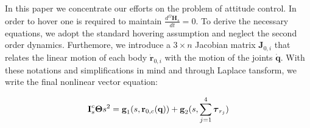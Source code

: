 In this paper we concentrate our efforts on the problem of attitude control. In order to hover one is required to maintain $\frac{d^{\Omega} \textbf{H}_s}{dt} = 0$. To derive the necessary equations, we adopt the standard hovering assumption and neglect the second order dynamics. Furthemore, we introduce a $3 \times n$ Jacobian matrix $\textbf{J}_{0,i}$ that relates the linear motion of each body $\dot{\textbf{r}}_{0,i}$ with the motion of the joints $\dot{\textbf{q}}$. With these notations and simplifications in mind and through Laplace tansform, we write the final nonlinear vector equation:

\begin{equation}\label{eq:final_ctrl_model}
\textbf{I}_s^c{\boldsymbol{\Theta}}s^2=\textbf{g}_1(s,\textbf{r}_{0,c}(\textbf{q}))+\textbf{g}_2(s,\sum_{j=1}^4 \boldsymbol{\tau}_{r_j}) 
\end{equation}

